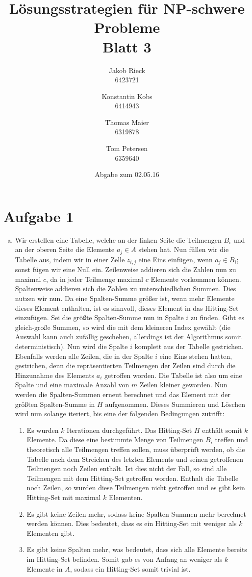 \documentclass[12pt,a4paper]{article}
\title{Lösungsstrategien für NP-schwere Probleme\\Blatt 3}
\author{
		Jakob Rieck\\
		\small{6423721}
	\and
		Konstantin Kobs\\
		\small{6414943}
	\and
		Thomas Maier\\
		\small{6319878}
	\and
		Tom Petersen\\
		\small{6359640}
}
\date{Abgabe zum 02.05.16}
\begin{document}
\maketitle

\section*{Aufgabe 1}

 \begin{enumerate}[a)]

 	\item Wir erstellen eine Tabelle, welche an der linken Seite die Teilmengen $B_i$ und an der oberen Seite die Elemente $a_j \in A$ stehen hat. Nun füllen wir die Tabelle aus, indem wir in einer Zelle $z_{i,j}$ eine Eins einfügen, wenn $a_j \in B_i$; sonst fügen wir eine Null ein. Zeilenweise addieren sich die Zahlen nun zu maximal $c$, da in jeder Teilmenge maximal $c$ Elemente vorkommen können. Spaltenweise addieren sich die Zahlen zu unterschiedlichen Summen. Dies nutzen wir nun. Da eine Spalten-Summe größer ist, wenn mehr Elemente dieses Element enthalten, ist es sinnvoll, dieses Element in das Hitting-Set einzufügen. Sei die größte Spalten-Summe nun in Spalte $i$ zu finden. Gibt es gleich-große Summen, so wird die mit dem kleineren Index gewählt (die Auswahl kann auch zufällig geschehen, allerdings ist der Algorithmus somit deterministisch). Nun wird die Spalte $i$ komplett aus der Tabelle gestrichen. Ebenfalls werden alle Zeilen, die in der Spalte $i$ eine Eins stehen hatten, gestrichen, denn die repräsentierten Teilmengen der Zeilen sind durch die Hinzunahme des Elements $a_i$ getroffen worden. Die Tabelle ist also um eine Spalte und eine maximale Anzahl von $m$ Zeilen kleiner geworden. Nun werden die Spalten-Summen erneut berechnet und das Element mit der größten Spalten-Summe in $H$ aufgenommen. Dieses Summieren und Löschen wird nun solange iteriert, bis eine der folgenden Bedingungen zutrifft:
 	
 		\begin{enumerate}[1.]
 			\item Es wurden $k$ Iterationen durchgeführt. Das Hitting-Set $H$ enthält somit $k$ Elemente. Da diese eine bestimmte Menge von Teilmengen $B_i$ treffen und theoretisch alle Teilmengen treffen sollen, muss überprüft werden, ob die Tabelle nach dem Streichen des letzten Elements und seinen getroffenen Teilmengen noch Zeilen enthält. Ist dies nicht der Fall, so sind alle Teilmengen mit dem Hitting-Set getroffen worden. Enthalt die Tabelle noch Zeilen, so wurden diese Teilmengen nicht getroffen und es gibt kein Hitting-Set mit maximal $k$ Elementen.
 			\item Es gibt keine Zeilen mehr, sodass keine Spalten-Summen mehr berechnet werden können. Dies bedeutet, dass es ein Hitting-Set mit weniger als $k$ Elementen gibt.
 			\item Es gibt keine Spalten mehr, was bedeutet, dass sich alle Elemente bereits im Hitting-Set befinden. Somit gab es von Anfang an weniger als $k$ Elemente in $A$, sodass ein Hitting-Set somit trivial ist.
 		\end{enumerate}
 		

\end{enumerate}
\end{document}
